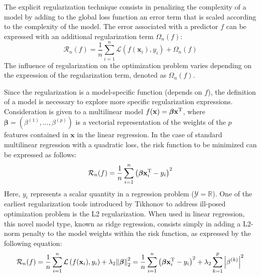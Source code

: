 \documentclass[main]{subfiles}
\begin{document}
The explicit regularization technique consists in penalizing the complexity of a model by adding to the global loss function an error term that is scaled according to the complexity of the model. The error associated with a predictor $f$ can be expressed with an additional regularization term ${\Omega}_n(f)$:
\begin{equation}
  \mathcal{R}_n(f) = \frac{1}{n}\sum_{i=1}^n \mathcal{L}\left(f(\mathbf{x}_i),y_i\right) + \Omega_n(f)
\end{equation}
The influence of regularization on the optimization problem varies depending on the expression of the regularization term, denoted as ${\Omega}_n(f)$. 

Since the regularization is a model-specific function (depends on $f$), the definition of a model is necessary to explore more specific regularization expressions.
Consideration is given to a multilinear model $f(\mathbf{x}) = \boldsymbol{\beta}\mathbf{x}^{\text{T}}$, where $\boldsymbol{\beta}=(\beta^{(1)},\ldots,\beta^{(p)})$ is a vectorial representation of the weights of the $p$ features contained in $\mathbf{x}$ in the linear regression. In the case of standard multilinear regression with a quadratic loss, the risk function to be minimized can be expressed as follows:
\begin{equation}\label{eq:linear}
  \mathcal{R}_n(f) = \frac{1}{n}\sum_{i=1}^n {\left(\boldsymbol{\beta}\mathbf{x}_i^{\text{T}}-y_i\right)}^2 
\end{equation}
Here, $y_i$ represents a scalar quantity in a regression problem ($\mathcal{Y}=\mathbb{R}$). One of the earliest regularization tools introduced by Tikhonov to address ill-posed optimization problem is the L2 regularization. When used in linear regression, this novel model type, known as ridge regression, consists simply in adding a L2-norm penalty to the model weights within the risk function, as expressed by the following equation:
\begin{equation}\label{eq:L2_reg}
  \mathcal{R}_n(f) = \frac{1}{n}\sum_{i=1}^n \mathcal{L}\left(f(\mathbf{x}_i),y_i\right) + \lambda_2 {\lVert \boldsymbol{\beta} \rVert}_2^2 = \frac{1}{n}\sum_{i=1}^n {\left(\boldsymbol{\beta}\mathbf{x}_i^{\text{T}}-y_i\right)}^2 + \lambda_2 \sum_{k=1}^p \left|\beta^{(k)}\right|^2
\end{equation}
\end{document}
